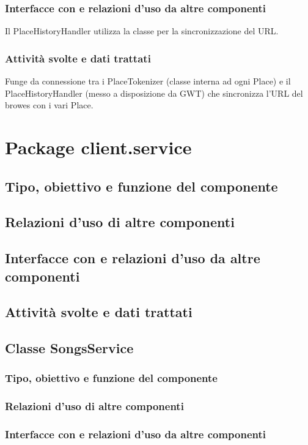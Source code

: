 \subsubsection*{Interfacce con e relazioni d'uso da altre componenti}
Il PlaceHistoryHandler utilizza la classe per la sincronizzazione del URL.
\subsubsection*{Attivit\`a svolte e dati trattati}
Funge da connessione tra i PlaceTokenizer (classe interna ad ogni Place) e il
PlaceHistoryHandler (messo a disposizione da GWT) che sincronizza l'URL del
browes con i vari Place.

\newpage
\section{Package client.service} %
\subsection*{Tipo, obiettivo e funzione del componente}
\subsection*{Relazioni d'uso di altre componenti}
\subsection*{Interfacce con e relazioni d'uso da altre componenti}
\subsection*{Attivit\`a svolte e dati trattati}

\subsection{Classe SongsService}
\subsubsection*{Tipo, obiettivo e funzione del componente}
\subsubsection*{Relazioni d'uso di altre componenti}
\subsubsection*{Interfacce con e relazioni d'uso da altre componenti}
